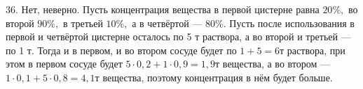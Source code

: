 36. Нет, неверно. Пусть концентрация вещества в первой цистерне равна $20\%,$ во второй $90\%,$ в третьей $10\%,$ а в четвёртой --- $80\%.$ Пусть после использования в первой и четвёртой цистерне осталось по 5 т раствора, а во второй и третьей --- по 1 т. Тогда и в первом, и во втором сосуде будет по $1+5=6$т
раствора, при этом в первом сосуде будет $5\cdot0,2+1\cdot0,9=1,9$т вещества, а во втором --- $1\cdot0,1+5\cdot0,8=4,1$т вещества, поэтому концентрация в нём будет больше.\\

